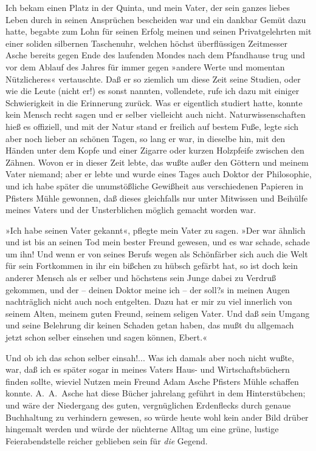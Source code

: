 Ich bekam einen Platz in der Quinta, und mein Vater, der sein
ganzes liebes Leben durch in seinen Ansprüchen bescheiden war und
ein dankbar Gemüt dazu hatte, begabte zum Lohn für seinen Erfolg
meinen und seinen Privatgelehrten mit einer soliden silbernen
Taschenuhr, welchen höchst überflüssigen Zeitmesser Asche bereits
gegen Ende des laufenden Mondes nach dem Pfandhause trug und vor
dem Ablauf des Jahres für immer gegen »andere Werte und momentan
Nützlicheres« vertauschte. Daß er so ziemlich um diese Zeit seine
Studien, oder wie die Leute (nicht er!) es sonst nannten,
vollendete, rufe ich dazu mit einiger Schwierigkeit in die
Erinnerung zurück. Was er eigentlich studiert hatte, konnte kein
Mensch recht sagen und er selber vielleicht auch nicht.
Naturwissenschaften hieß es offiziell, und mit der Natur stand er
freilich auf bestem Fuße, legte sich aber noch lieber an schönen
Tagen, so lang er war, in dieselbe hin, mit den Händen unter dem
Kopfe und einer Zigarre oder kurzen Holzpfeife zwischen den Zähnen.
Wovon er in dieser Zeit lebte, das wußte außer den Göttern und
meinem Vater niemand; aber er lebte und wurde eines Tages auch
Doktor der Philosophie, und ich habe später die unumstößliche
Gewißheit aus verschiedenen Papieren in Pfisters Mühle gewonnen,
daß dieses gleichfalls nur unter Mitwissen und Beihülfe meines
Vaters und der Unsterblichen möglich gemacht worden war.

»Ich habe seinen Vater gekannt«, pflegte mein Vater zu sagen. »Der
war ähnlich und ist bis an seinen Tod mein bester Freund gewesen,
und es war schade, schade um ihn! Und wenn er von seines Berufs
wegen als Schönfärber sich auch die Welt für sein Fortkommen in ihr
ein bißchen zu hübsch gefärbt hat, so ist doch kein anderer Mensch
als er selber und höchstens sein Junge dabei zu Verdruß gekommen,
und der – deinen Doktor meine ich – der soll?s in meinen Augen
nachträglich nicht auch noch entgelten. Dazu hat er mir zu viel
innerlich von seinem Alten, meinem guten Freund, seinem seligen
Vater. Und daß sein Umgang und seine Belehrung dir keinen Schaden
getan haben, das mußt du allgemach jetzt schon selber einsehen und
sagen können, Ebert.«

Und ob ich das schon selber einsah!... Was ich damals aber noch
nicht wußte, war, daß ich es später sogar in meines Vaters Haus-
und Wirtschaftsbüchern finden sollte, wieviel Nutzen mein Freund
Adam Asche Pfisters Mühle schaffen konnte. A.~A.~Asche hat diese
Bücher jahrelang geführt in dem Hinterstübchen; und wäre der
Niedergang des guten, vergnüglichen Erdenflecks durch genaue
Buchhaltung zu verhindern gewesen, so würde heute wohl kein ander
Bild drüber hingemalt werden und würde der nüchterne Alltag um eine
grüne, lustige Feierabendstelle reicher geblieben sein für
\emph{die} Gegend.

